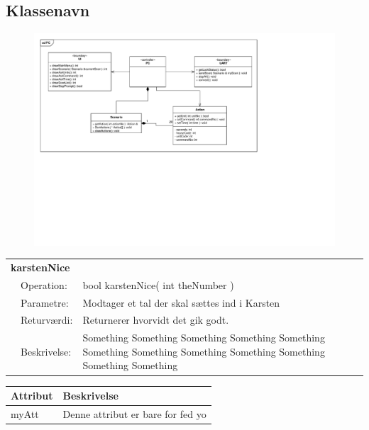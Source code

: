 \subsection{Klassenavn}

\begin{figure}[h]
\centering
\includegraphics[scale=1,clip=true, trim=38 433 625 50]{../Systemarkitektur/diagrammer/PC_KlasseDiagram} %
\end{figure}

\begin{table}[h]
\begin{tabularx}{\textwidth}{p{0.6 cm} l X} %
\multicolumn{3}{l}{\textbf{karstenNice}}\\
& Operation: & %
bool karstenNice( int theNumber ) 
\\ & Parametre: & %
Modtager et tal der skal sættes ind i Karsten 
\\ & Returværdi: & %
Returnerer hvorvidt det gik godt. 
\\ & Beskrivelse: & %
Something Something Something Something Something Something Something Something Something Something Something Something 
\\ \end{tabularx}
\end{table}

\begin{table}[h]
\centering
\begin{tabularx}{13 cm}{|l |X|} \hline
Attribut & Beskrivelse \\ \hline

myAtt & Denne attribut er bare for fed yo \\ \hline

\end{tabularx}
\end{table}